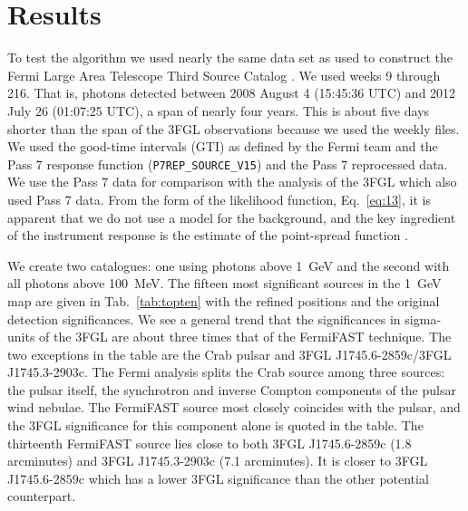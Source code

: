 \documentclass[useAMS,usenatbib]{mn2e}
\begin{document}
\section{Results}
\label{sec:results}

To test the algorithm we used nearly the same data set as used to
construct the Fermi Large Area Telescope Third Source Catalog
\cite[3FGL][]{2015ApJS..218...23A}.  We used weeks 9 through 216. That
is, photons detected between 2008 August 4 (15:45:36 UTC) and 2012
July 26 (01:07:25 UTC), a span of nearly four years.  This is about
five days shorter than the span of the 3FGL observations because we
used the weekly files.  We used the good-time intervals (GTI) as
defined by the Fermi team and the Pass 7 response function
(\texttt{P7REP\_SOURCE\_V15}) and the Pass 7 reprocessed data.  We use
the Pass 7 data for comparison with the analysis of the 3FGL which
also used Pass 7 data. From the form of the likelihood function,
Eq.~\ref{eq:13}, it is apparent that we do not use a model for the
background, and the key ingredient of the instrument response is the
estimate of the point-spread function \citep{2012ApJS..203....4A}.

We create two catalogues: one using photons above 1~GeV and the second
with all photons above 100~MeV.  The fifteen most significant sources in
the 1~GeV map are given in Tab.~\ref{tab:topten} with the refined
positions and the original detection significances.  We see a general
trend that the significances in sigma-units of the 3FGL are about
three times that of the FermiFAST technique.  The two exceptions in
the table are the Crab pulsar and 3FGL J1745.6-2859c/3FGL
J1745.3-2903c.  The Fermi analysis splits the Crab source among three
sources: the pulsar itself, the synchrotron and inverse Compton
components of the pulsar wind nebulae.  The FermiFAST source most
closely coincides with the pulsar, and the 3FGL significance for this
component alone is quoted in the table.  The thirteenth FermiFAST
source lies close to both 3FGL J1745.6-2859c (1.8 arcminutes) and 3FGL
J1745.3-2903c (7.1 arcminutes).  It is closer to 3FGL
J1745.6-2859c which has a lower 3FGL significance than the other
potential counterpart.
%
%
\end{document}
